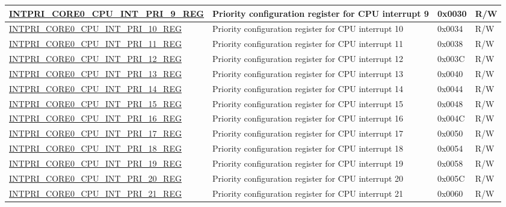 \begin{longtable}{ | p{10cm} | p{10cm} | p{1.3cm} | p{1cm} | }
\hyperref[regdesc:INTPRICORE0CPUINTPRINREG]{INTPRI\_CORE0\_CPU\_INT\_PRI\_9\_REG} & Priority configuration register for CPU interrupt 9 & 0x0030 & R/W \\ \hline
\hyperref[regdesc:INTPRICORE0CPUINTPRINREG]{INTPRI\_CORE0\_CPU\_INT\_PRI\_10\_REG} & Priority configuration register for CPU interrupt 10 & 0x0034 & R/W \\ \hline
\hyperref[regdesc:INTPRICORE0CPUINTPRINREG]{INTPRI\_CORE0\_CPU\_INT\_PRI\_11\_REG} & Priority configuration register for CPU interrupt 11 & 0x0038 & R/W \\ \hline
\hyperref[regdesc:INTPRICORE0CPUINTPRINREG]{INTPRI\_CORE0\_CPU\_INT\_PRI\_12\_REG} & Priority configuration register for CPU interrupt 12 & 0x003C & R/W \\ \hline
\hyperref[regdesc:INTPRICORE0CPUINTPRINREG]{INTPRI\_CORE0\_CPU\_INT\_PRI\_13\_REG} & Priority configuration register for CPU interrupt 13 & 0x0040 & R/W \\ \hline
\hyperref[regdesc:INTPRICORE0CPUINTPRINREG]{INTPRI\_CORE0\_CPU\_INT\_PRI\_14\_REG} & Priority configuration register for CPU interrupt 14 & 0x0044 & R/W \\ \hline
\hyperref[regdesc:INTPRICORE0CPUINTPRINREG]{INTPRI\_CORE0\_CPU\_INT\_PRI\_15\_REG} & Priority configuration register for CPU interrupt 15 & 0x0048 & R/W \\ \hline
\hyperref[regdesc:INTPRICORE0CPUINTPRINREG]{INTPRI\_CORE0\_CPU\_INT\_PRI\_16\_REG} & Priority configuration register for CPU interrupt 16 & 0x004C & R/W \\ \hline
\hyperref[regdesc:INTPRICORE0CPUINTPRINREG]{INTPRI\_CORE0\_CPU\_INT\_PRI\_17\_REG} & Priority configuration register for CPU interrupt 17 & 0x0050 & R/W \\ \hline
\hyperref[regdesc:INTPRICORE0CPUINTPRINREG]{INTPRI\_CORE0\_CPU\_INT\_PRI\_18\_REG} & Priority configuration register for CPU interrupt 18 & 0x0054 & R/W \\ \hline
\hyperref[regdesc:INTPRICORE0CPUINTPRINREG]{INTPRI\_CORE0\_CPU\_INT\_PRI\_19\_REG} & Priority configuration register for CPU interrupt 19 & 0x0058 & R/W \\ \hline
\hyperref[regdesc:INTPRICORE0CPUINTPRINREG]{INTPRI\_CORE0\_CPU\_INT\_PRI\_20\_REG} & Priority configuration register for CPU interrupt 20 & 0x005C & R/W \\ \hline
\hyperref[regdesc:INTPRICORE0CPUINTPRINREG]{INTPRI\_CORE0\_CPU\_INT\_PRI\_21\_REG} & Priority configuration register for CPU interrupt 21 & 0x0060 & R/W \\ \hline

\end{longtable}
